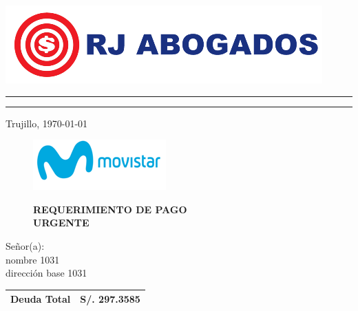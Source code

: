 %
%

\begin{flushleft}
\includegraphics[natwidth=12.170833333cm, natheight=2.989791667cm]{resources/logo.png}
\end{flushleft}
\vspace{-0.8cm}
\textcolor[rgb]{1.00,0.00,0.00}{
\hrule
\hrule
}

\begin{flushright}
    Trujillo, \today
\end{flushright}
\vspace{-0.5cm}

\begin{figure}[h]
\begin{minipage}[b]{5.106458333cm}
\includegraphics[natwidth=5.106458333cm, natheight=1.931458333cm]{resources/business_logo.png}
\end{minipage}
\begin{minipage}[b][1.9314cm][t]{11cm}
\begin{flushright}
{\LARGE \bf REQUERIMIENTO DE PAGO\\URGENTE}
\end{flushright}
\end{minipage}
\end{figure}

\noindent
Señor(a):\\
nombre 1031\\
dirección base 1031

\begin{flushright}
\bf \large
\begin{tabular}{|p{3.2cm} p{3.2cm}|}
\hline
Deuda Total & S/. 297.3585 \\
\hline
\end{tabular}
\end{flushright}

